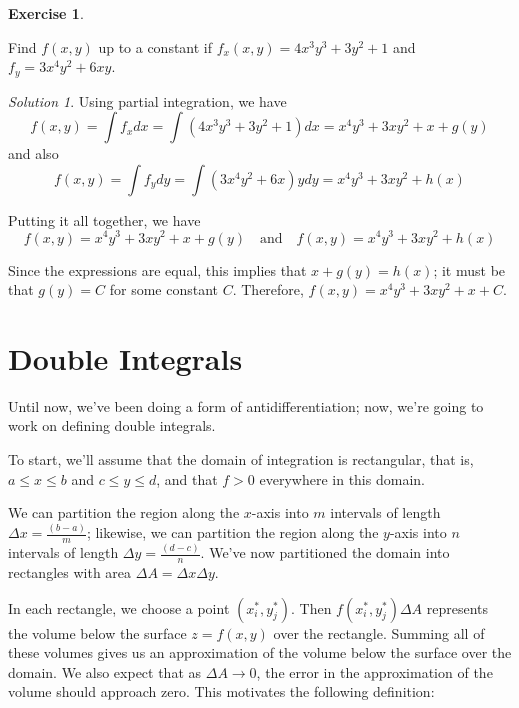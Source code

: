 \documentclass[
]{book}
\theoremstyle{definition}
\theoremstyle{definition}
\theoremstyle{definition}
\newtheorem{exercise}{Exercise}[chapter]
\theoremstyle{definition}
\theoremstyle{remark}
\newtheorem*{solution}{Solution}
\begin{document}
\begin{exercise}
\protect\hypertarget{exr:unlabeled-div-74}{}\label{exr:unlabeled-div-74}

Find \(f(x,y)\) up to a constant if \(f_{x}(x,y)=4x^3y^3+3y^2+1\) and \(f_y = 3x^4y^2+6xy\).

\end{exercise}

\begin{solution}

Using partial integration, we have \[f(x,y)=\displaystyle \int f_xdx = \int (4x^3y^3+3y^2+1) dx =x^4y^3+3xy^2+x+g(y)\] and also \[f(x,y)=\displaystyle \int f_ydy = \int (3x^4y^2+6x)y dy = x^4y^3+3xy^2+h(x)\]

Putting it all together, we have \[f(x,y)=x^4y^3+3xy^2+x+g(y) \quad \mbox{and} \quad f(x,y)=x^4y^3+3xy^2+h(x)\]

Since the expressions are equal, this implies that \(x+g(y)=h(x)\); it must be that \(g(y)=C\) for some constant \(C\). Therefore, \(f(x,y)=x^4y^3+3xy^2+x+C\).

\end{solution}

\hypertarget{double-integrals}{%
\section{Double Integrals}\label{double-integrals}}

Until now, we've been doing a form of antidifferentiation; now, we're going to work on defining double integrals.

To start, we'll assume that the domain of integration is rectangular, that is, \(a\leq x\leq b\) and \(c\leq y\leq d\), and that \(f>0\) everywhere in this domain.

We can partition the region along the \(x\)-axis into \(m\) intervals of length \(\Delta x=\frac{(b-a)}{m}\); likewise, we can partition the region along the \(y\)-axis into \(n\) intervals of length \(\Delta y = \frac{(d-c)}{n}\). We've now partitioned the domain into rectangles with area \(\Delta A=\Delta x\Delta y\).

In each rectangle, we choose a point \((x_i^*, y_j^*)\). Then \(f(x_i^*, y_j^*)\Delta A\) represents the volume below the surface \(z=f(x,y)\) over the rectangle. Summing all of these volumes gives us an approximation of the volume below the surface over the domain. We also expect that as \(\Delta A\to 0\), the error in the approximation of the volume should approach zero. This motivates the following definition:
\end{document}
